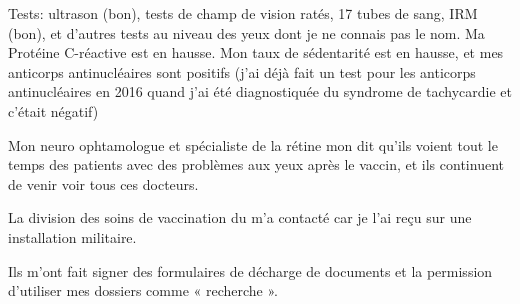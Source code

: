 Tests: ultrason (bon), tests de champ de vision ratés, 17 tubes de sang, IRM
(bon), et d'autres tests au niveau des yeux dont je ne connais pas le nom. Ma
Protéine C-réactive est en hausse. Mon taux de sédentarité est en hausse, et mes
anticorps antinucléaires sont positifs (j'ai déjà fait un test pour les
anticorps antinucléaires en 2016 quand j'ai été diagnostiquée du syndrome de
tachycardie et c'était négatif)

Mon neuro ophtamologue et spécialiste de la rétine mon dit qu'ils voient tout le
temps des patients avec des problèmes aux yeux après le vaccin, et ils
continuent de venir voir tous ces docteurs.

La division des soins de vaccination du  m'a contacté car je
l'ai reçu sur une installation militaire.

Ils m'ont fait signer des formulaires de décharge de documents et la permission
d'utiliser mes dossiers comme « recherche ».


